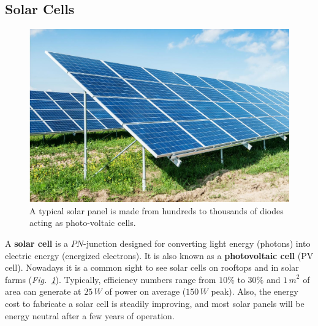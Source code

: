 \subsection{Solar Cells}
\begin{figure}[tb]
\centering
\includegraphics[width=.85\columnwidth]{solar_cell.jpg}
\caption{A typical solar panel is made from hundreds to thousands of diodes acting as photo-voltaic cells.}
\label{fig:solar_cell}
\end{figure}
A \textbf{solar cell} is a $PN$-junction designed for converting light energy (photons) into electric energy (energized electrons).  It is also known as a \textbf{photovoltaic cell} (PV cell).  Nowadays it is a common sight to see solar cells on rooftops and in solar farms (\emph{Fig.~\ref{fig:solar_cell}}).  Typically, efficiency numbers range from $10\%$ to $30\%$ and ${1\,m}^2$ of area can generate at $25\,W$ of power on average ($150\,W$ peak).  Also, the energy cost to fabricate a solar cell is steadily improving, and most solar panels will be energy neutral after a few years of operation.
